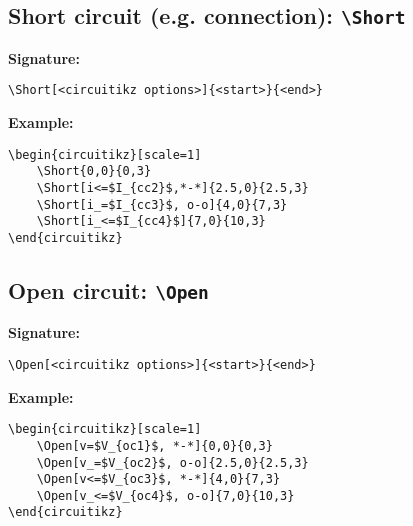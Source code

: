 \documentclass[a4paper,12pt]{article}
\begin{document}
\subsection{Short circuit (e.g. connection): \texttt{\textbackslash Short}}

\textbf{Signature:}
\begin{verbatim}
\Short[<circuitikz options>]{<start>}{<end>}
\end{verbatim}

\textbf{Example:}

\begin{lstlisting}[style=latexstyle]
\begin{circuitikz}[scale=1]
	\Short{0,0}{0,3}
	\Short[i<=$I_{cc2}$,*-*]{2.5,0}{2.5,3}
	\Short[i_=$I_{cc3}$, o-o]{4,0}{7,3}
	\Short[i_<=$I_{cc4}$]{7,0}{10,3}
\end{circuitikz}
\end{lstlisting}


\begin{center}
\begin{circuitikz}[scale=1]
\end{circuitikz}
\end{center}


\subsection{Open circuit: \texttt{\textbackslash Open}}

\textbf{Signature:}
\begin{verbatim}
\Open[<circuitikz options>]{<start>}{<end>}
\end{verbatim}

\textbf{Example:}

\begin{lstlisting}[style=latexstyle]
\begin{circuitikz}[scale=1]
	\Open[v=$V_{oc1}$, *-*]{0,0}{0,3}
	\Open[v_=$V_{oc2}$, o-o]{2.5,0}{2.5,3}
	\Open[v<=$V_{oc3}$, *-*]{4,0}{7,3}
	\Open[v_<=$V_{oc4}$, o-o]{7,0}{10,3}
\end{circuitikz}
\end{lstlisting}


\begin{center}
\begin{circuitikz}[scale=1]
\end{circuitikz}
\end{center}
\end{document}
